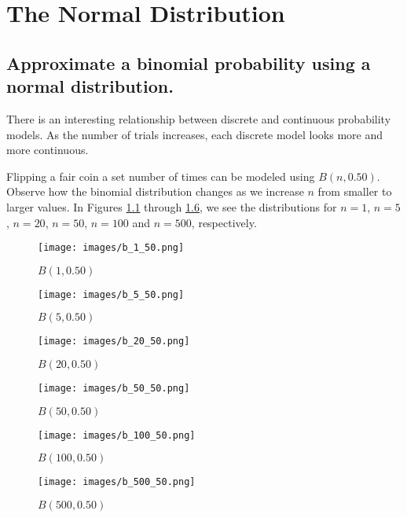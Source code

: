 \setcounter{chapter}{5}
\chapter[Normal Dist]{The Normal Distribution}

\section[Normal approximation]{Approximate a binomial probability using a normal distribution.}

There is an interesting relationship between discrete and continuous probability models. As the number of trials increases, each discrete model looks more and more continuous.

\begin{example}
Flipping a fair coin a set number of times can be modeled using \(B(n,0.50)\). Observe how the binomial distribution changes as we increase \(n\) from smaller to larger values. 
In Figures \ref{fig:Bn1p50} through \ref{fig:Bn500p50}, we see the distributions for \(n=1\), \(n=5\), \(n=20\), \(n=50\), \(n=100\) and \(n=500\), respectively.
\end{example}

\begin{figure}
	\centering
    \texttt{[image: images/b\_1\_50.png]}
	\caption{\(B(1,0.50)\)}
	\label{fig:Bn1p50}
\end{figure}


\begin{figure}
	\centering
    \texttt{[image: images/b\_5\_50.png]}
	\caption{\(B(5,0.50)\)}
	\label{fig:Bn5p50}
\end{figure}

\begin{figure}
	\centering
    \texttt{[image: images/b\_20\_50.png]}
    \caption{\(B(20,0.50)\)}
	\label{fig:Bn20p50}
\end{figure}

\begin{figure}
	\centering
    \texttt{[image: images/b\_50\_50.png]}
    \caption{\(B(50,0.50)\)}
	\label{fig:Bn50p50}
\end{figure}

\begin{figure}
	\centering
    \texttt{[image: images/b\_100\_50.png]}
    \caption{\(B(100,0.50)\)}
	\label{fig:Bn100p50}
\end{figure}

\begin{figure}
	\centering
    \texttt{[image: images/b\_500\_50.png]}
    \caption{\(B(500,0.50)\)}
	\label{fig:Bn500p50}
\end{figure}

